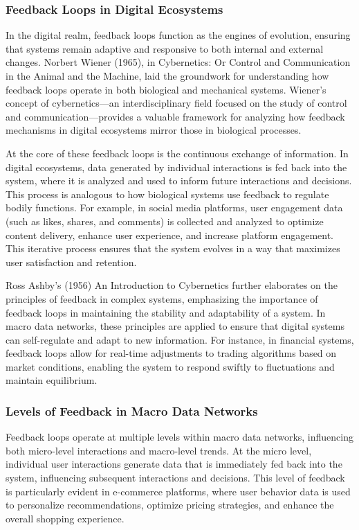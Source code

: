 \documentclass[12pt,twoside]{article}
\begin{document}
\subsubsection{Feedback Loops in Digital Ecosystems}

In the digital realm, feedback loops function as the engines of evolution, ensuring that systems remain adaptive and responsive to both internal and external changes. Norbert Wiener (1965), in Cybernetics: Or Control and Communication in the Animal and the Machine, laid the groundwork for understanding how feedback loops operate in both biological and mechanical systems. Wiener’s concept of cybernetics—an interdisciplinary field focused on the study of control and communication—provides a valuable framework for analyzing how feedback mechanisms in digital ecosystems mirror those in biological processes.

At the core of these feedback loops is the continuous exchange of information. In digital ecosystems, data generated by individual interactions is fed back into the system, where it is analyzed and used to inform future interactions and decisions. This process is analogous to how biological systems use feedback to regulate bodily functions. For example, in social media platforms, user engagement data (such as likes, shares, and comments) is collected and analyzed to optimize content delivery, enhance user experience, and increase platform engagement. This iterative process ensures that the system evolves in a way that maximizes user satisfaction and retention.

Ross Ashby’s (1956) An Introduction to Cybernetics further elaborates on the principles of feedback in complex systems, emphasizing the importance of feedback loops in maintaining the stability and adaptability of a system. In macro data networks, these principles are applied to ensure that digital systems can self-regulate and adapt to new information. For instance, in financial systems, feedback loops allow for real-time adjustments to trading algorithms based on market conditions, enabling the system to respond swiftly to fluctuations and maintain equilibrium.

\subsubsection{Levels of Feedback in Macro Data Networks}

Feedback loops operate at multiple levels within macro data networks, influencing both micro-level interactions and macro-level trends. At the micro level, individual user interactions generate data that is immediately fed back into the system, influencing subsequent interactions and decisions. This level of feedback is particularly evident in e-commerce platforms, where user behavior data is used to personalize recommendations, optimize pricing strategies, and enhance the overall shopping experience.
\end{document}
